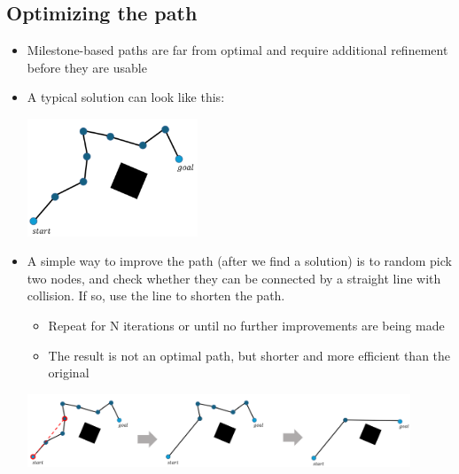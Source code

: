 \documentclass[10pt]{article}
\begin{document}
\subsection*{Optimizing the path}
\begin{itemize}
	\item Milestone-based paths are far from optimal and require additional refinement before they are usable
	\item A typical solution can look like this:
	\begin{center} 
        \includegraphics*[width=0.4\textwidth]{L1_14.png} 
    \end{center}
    \item A simple way to improve the path (after we find a solution) is to random pick two nodes, and check whether they can be connected by a straight line with collision.  If so, use the line to shorten the path.
    \begin{itemize}
        \item Repeat for N iterations or until no further improvements are being made
        \item The result is not an optimal path, but shorter and more efficient than the original
    \end{itemize}
    \begin{center} 
        \includegraphics*[width=0.9\textwidth]{L1_15.png} 
    \end{center}
\end{itemize}
\end{document}
